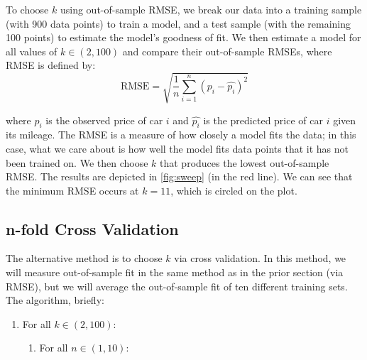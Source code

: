 \documentclass[11pt, fleqn, titlepage]{article}
\begin{document}
To choose \(k\) using out-of-sample RMSE, we break our data into a training sample (with 900 data points) to train a model, and a test sample (with the remaining 100 points) to estimate the model's goodness of fit. We then estimate a model for all values of \(k \in (2,100)\) and compare their out-of-sample RMSEs, where RMSE is defined by:
\[ \text{RMSE} = \sqrt{\frac{1}{n} \sum_{i=1}^{n} \left( p_i - \hat{p_i} \right)^2} \]

where \(p_i\) is the observed price of car \(i\) and \(\hat{p_i}\) is the predicted price of car \(i\) given its mileage. The RMSE is a measure of how closely a model fits the data; in this case, what we care about is how well the model fits data points that it has not been trained on. We then choose \(k\) that produces the lowest out-of-sample RMSE. The results are depicted in \cref{fig:sweep} (in the red line). We can see that the minimum RMSE occurs at \(k=11\), which is circled on the plot.

\subsection{n-fold Cross Validation}

The alternative method is to choose \(k\) via cross validation. In this method, we will measure out-of-sample fit in the same method as in the prior section (via RMSE), but we will average the out-of-sample fit of ten different training sets. The algorithm, briefly:
\begin{enumerate}
\item For all \(k \in (2,100)\):
\begin{enumerate}
\item For all \(n \in (1, 10)\):
\end{enumerate}
\end{enumerate}
\end{document}
